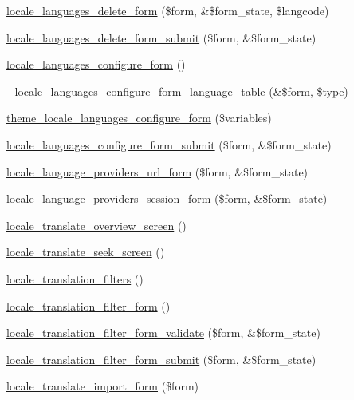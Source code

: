 \begin{DoxyCompactItemize}
\item 
\hyperlink{group__locale_gae91146ea73b4fde0a5584e4a9e502903}{locale\_\-languages\_\-delete\_\-form} (\$form, \&\$form\_\-state, \$langcode)
\item 
\hyperlink{group__locale_gadbf1eb80de38d65bda55e63699822e3c}{locale\_\-languages\_\-delete\_\-form\_\-submit} (\$form, \&\$form\_\-state)
\item 
\hyperlink{group__locale_gad4a0fb5717a5318793af57ec86169949}{locale\_\-languages\_\-configure\_\-form} ()
\item 
\hyperlink{group__locale_ga3aeae5dacd89af2116019f5964787c48}{\_\-locale\_\-languages\_\-configure\_\-form\_\-language\_\-table} (\&\$form, \$type)
\item 
\hyperlink{group__themeable_gad16df2552ed4113a2043e83502d4aeba}{theme\_\-locale\_\-languages\_\-configure\_\-form} (\$variables)
\item 
\hyperlink{group__locale_gad11520d8b7d086b4b801b4a51068ed11}{locale\_\-languages\_\-configure\_\-form\_\-submit} (\$form, \&\$form\_\-state)
\item 
\hyperlink{group__locale_ga8317379be8d1288234df3c3ffb7d39ee}{locale\_\-language\_\-providers\_\-url\_\-form} (\$form, \&\$form\_\-state)
\item 
\hyperlink{group__locale_ga16437fdd6666d431070599a6243cfb11}{locale\_\-language\_\-providers\_\-session\_\-form} (\$form, \&\$form\_\-state)
\item 
\hyperlink{group__locale_gac36ea050ad5c0a75624c1a9b63c343a0}{locale\_\-translate\_\-overview\_\-screen} ()
\item 
\hyperlink{group__locale_gaa34fbb14f95e9ae562772895b284d170}{locale\_\-translate\_\-seek\_\-screen} ()
\item 
\hyperlink{group__locale_gacc11c165dc42516edefdca5eab092a28}{locale\_\-translation\_\-filters} ()
\item 
\hyperlink{group__forms_gac2e3730d5cd788d059298b3ada8f5a9b}{locale\_\-translation\_\-filter\_\-form} ()
\item 
\hyperlink{group__locale_ga853ff354fb4c4c637123251916ccb4ae}{locale\_\-translation\_\-filter\_\-form\_\-validate} (\$form, \&\$form\_\-state)
\item 
\hyperlink{group__locale_gac578de2fae636045173446f2aa26bd0f}{locale\_\-translation\_\-filter\_\-form\_\-submit} (\$form, \&\$form\_\-state)
\item 
\hyperlink{group__locale_gaceb2c6612ad9bc1472e4d3c71618c9b3}{locale\_\-translate\_\-import\_\-form} (\$form)
\item 

\end{DoxyCompactItemize}

